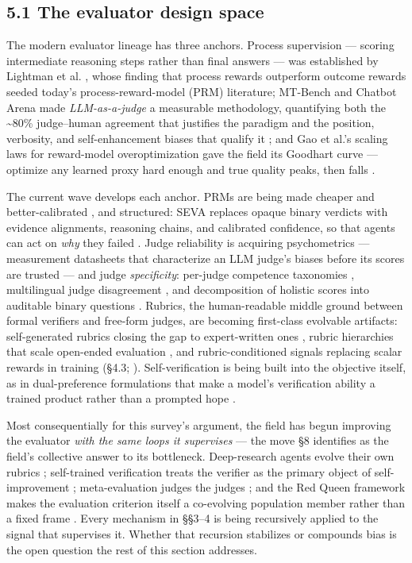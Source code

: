 \documentclass[
  11pt,
]{article}
\begin{document}
\subsection{5.1 The evaluator design
space}\label{the-evaluator-design-space}

The modern evaluator lineage has three anchors. Process supervision ---
scoring intermediate reasoning steps rather than final answers --- was
established by Lightman et al. \citep{lightman2023verify}, whose finding
that process rewards outperform outcome rewards seeded today's
process-reward-model (PRM) literature; MT-Bench and Chatbot Arena made
\emph{LLM-as-a-judge} a measurable methodology, quantifying both the
\textasciitilde80\% judge--human agreement that justifies the paradigm
and the position, verbosity, and self-enhancement biases that qualify it
\citep{zheng2023judging}; and Gao et al.'s scaling laws for reward-model
overoptimization gave the field its Goodhart curve --- optimize any
learned proxy hard enough and true quality peaks, then falls
\citep{gao2023scaling}.

The current wave develops each anchor. PRMs are being made cheaper and
better-calibrated \citep{lee2026efficient}, and structured: SEVA
replaces opaque binary verdicts with evidence alignments, reasoning
chains, and calibrated confidence, so that agents can act on \emph{why}
they failed \citep{yuan2026seva}. Judge reliability is acquiring
psychometrics --- measurement datasheets that characterize an LLM
judge's biases before its scores are trusted \citep{usami2026llm} ---
and judge \emph{specificity}: per-judge competence taxonomies
\citep{cao2026each}, multilingual judge disagreement \citep{fu2026when},
and decomposition of holistic scores into auditable binary questions
\citep{cho2026ask}. Rubrics, the human-readable middle ground between
formal verifiers and free-form judges, are becoming first-class
evolvable artifacts: self-generated rubrics closing the gap to
expert-written ones \citep{sun2026support}, rubric hierarchies that
scale open-ended evaluation \citep{zhang2026rubricstree}, and
rubric-conditioned signals replacing scalar rewards in training (§4.3;
\citep{gu2026rethinking}). Self-verification is being built into the
objective itself, as in dual-preference formulations that make a model's
verification ability a trained product rather than a prompted hope
\citep{she2025dupo}.

Most consequentially for this survey's argument, the field has begun
improving the evaluator \emph{with the same loops it supervises} --- the
move §8 identifies as the field's collective answer to its bottleneck.
Deep-research agents evolve their own rubrics \citep{wan2026inference};
self-trained verification treats the verifier as the primary object of
self-improvement \citep{wu2026self}; meta-evaluation judges the judges
\citep{sui2026conversation}; and the Red Queen framework makes the
evaluation criterion itself a co-evolving population member rather than
a fixed frame \citep{iacob2026red}. Every mechanism in §§3--4 is being
recursively applied to the signal that supervises it. Whether that
recursion stabilizes or compounds bias is the open question the rest of
this section addresses.
\end{document}
